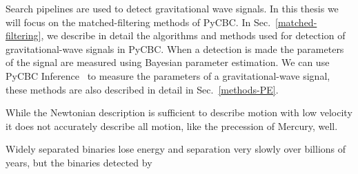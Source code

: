 Search pipelines are used to detect gravitational wave signals. In this thesis we will focus on the matched-filtering methods of PyCBC. In Sec.~\ref{matched-filtering}, we describe in detail the algorithms and methods used for detection of gravitational-wave signals in PyCBC. When a detection is made the parameters of the signal are measured using Bayesian parameter estimation. We can use PyCBC Inference~\cite{Biwer:2018osg} to measure the parameters of a gravitational-wave signal, these methods are also described in detail in Sec.~\ref{methods-PE}.

While the Newtonian description is sufficient to describe motion with low velocity it does not accurately describe all motion, like the precession of Mercury, well.

Widely separated binaries lose energy and separation very slowly over billions of years, but the binaries detected by  